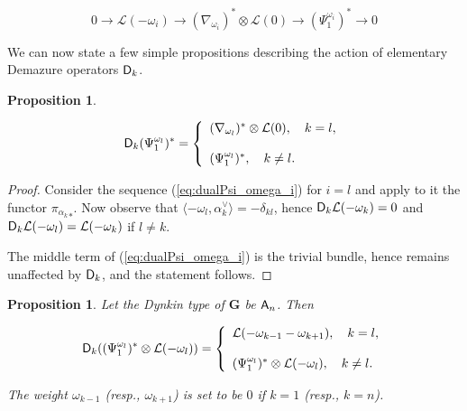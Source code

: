 \documentclass[sn-mathphys-num]{sn-jnl}%
\newcommand{\Ll}{\mathcal L}
\newcommand{\bg}{\mathbf G}
\newtheorem{proposition}[theorem]{Proposition}
\theoremstyle{definition}
\begin{document}
\begin{equation}\label{eq:dualPsi_omega_i}
0\rightarrow \Ll (-\omega _i)\rightarrow (\nabla _{\omega _i})^{\ast}\otimes \Ll (0)\rightarrow (\Psi _1^{\omega _i})^{\ast}\rightarrow 0
\end{equation}

We can now state a few simple propositions describing the action of elementary Demazure operators ${\sf D}_k$.

\begin{proposition}\label{prop:pi_k_*Psi _l}


\begin{equation}\label{eq:D_kPsi _lac}
{\sf D}_k(\Psi _1^{\omega _l})^{\ast}=\left\{
   \begin{array}{l}
    (\nabla _{\omega _l})^{\ast}\otimes \Ll (0), \quad k=l,\\
    \\
    (\Psi _1^{\omega _l})^{\ast}, \quad k\neq l. \\
   \end{array}
  \right.
\end{equation}
\end{proposition}

\begin{proof}
Consider the sequence (\ref{eq:dualPsi_omega_i}) for $i=l$ and apply to it the functor ${\pi _{\alpha _k}}_{\ast}$. Now observe that $\langle -\omega _l,\alpha _k^{\vee}\rangle =-\delta _{kl}$,
hence ${\sf D}_k\Ll (-\omega _k)=0$ and ${\sf D}_k\Ll (-\omega _l)=\Ll (-\omega _k)$ if $l\neq k$. 

The middle term of (\ref{eq:dualPsi_omega_i}) is the trivial bundle, hence remains unaffected by ${\sf D}_k$, and the statement follows.
\end{proof}

\begin{proposition}\label{prop:pi_k_*Psi _l(-l)a}
Let the Dynkin type of $ \bg$ be ${\sf A}_n$. Then 

\begin{equation}\label{eq:pi_k_*Psi _l(-l)b}
{\sf D}_k((\Psi _1^{\omega _l})^{\ast}\otimes \Ll (-\omega _l))=\left\{
   \begin{array}{l}
    \Ll (-\omega _{k-1}-\omega _{k+1}), \quad k=l,\\
    \\
    (\Psi _1^{\omega _l})^{\ast}\otimes \Ll (-\omega _l), \quad k\neq l. \\
   \end{array}
  \right.
\end{equation}

The weight $\omega _{k-1}$ (resp., $\omega _{k+1}$) is set to be $0$ if $k=1$ (resp., $k=n$).
\end{proposition}
\end{document}
